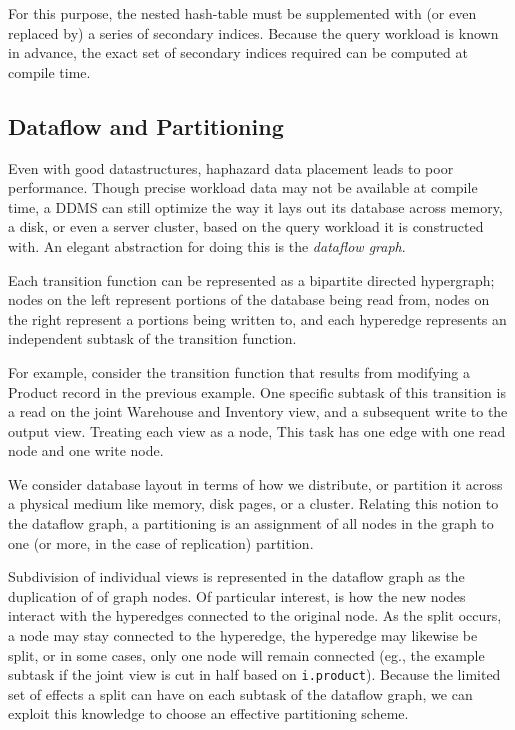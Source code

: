 For this purpose, the nested hash-table must be supplemented with (or even replaced by) a series of secondary indices.  Because the query workload is known in advance, the exact set of secondary indices required can be computed at compile time.  


\subsection{Dataflow and Partitioning}
Even with good datastructures, haphazard data placement leads to poor performance.  Though precise workload data may not be available at compile time, a DDMS can still optimize the way it lays out its database across memory, a disk, or even a server cluster, based on the query workload it is constructed with.  An elegant abstraction for doing this is the \textit{dataflow graph}.

Each transition function can be represented as a bipartite directed hypergraph; nodes on the left represent portions of the database being read from, nodes on the right represent a portions being written to, and each hyperedge represents an independent subtask of the transition function.

For example, consider the transition function that results from modifying a Product record in the previous example.  One specific subtask of this transition is a read on the joint Warehouse and Inventory view, and a subsequent write to the output view.  Treating each view as a node, This task has one edge with one read node and one write node.  

We consider database layout in terms of how we distribute, or partition it across a physical medium like memory, disk pages, or a cluster.  Relating this notion to the dataflow graph, a partitioning is an assignment of all nodes in the graph to one (or more, in the case of replication) partition.  

Subdivision of individual views is represented in the dataflow graph as the duplication of  of graph nodes.  Of particular interest, is how the new nodes interact with the hyperedges connected to the original node.  As the split occurs, a node may stay connected to the hyperedge, the hyperedge may likewise be split, or in some cases, only one node will remain connected (eg., the example subtask if the joint view is cut in half based on \texttt{i.product}).  Because the limited set of effects a split can have on each subtask of the dataflow graph, we can exploit this knowledge to choose an effective partitioning scheme.

